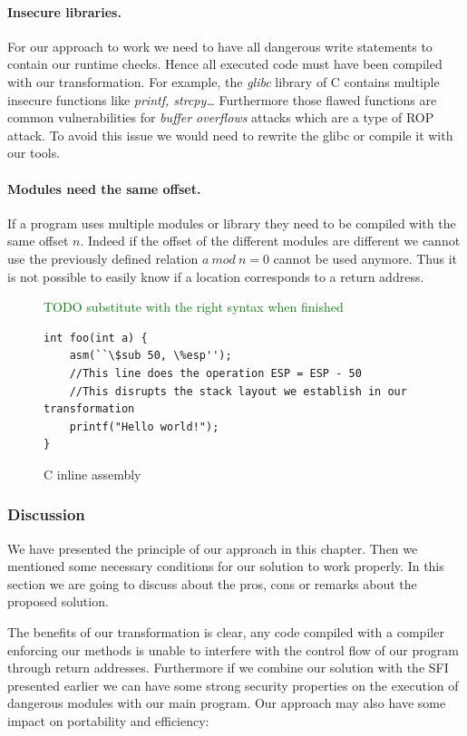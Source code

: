 \documentclass[11pt]{sdm}
\begin{document}
\paragraph{Insecure libraries.}
\label{par:Insecure libraries}

For our approach to work we need to have all dangerous write statements to contain our runtime checks. Hence all executed code must have been compiled with our transformation. For example, the \textit{glibc} library of C contains multiple insecure functions like \textit{printf, strcpy\dots} Furthermore those flawed functions are common vulnerabilities for \textit{buffer overflows} attacks which are a type of ROP attack. To avoid this issue we would need to rewrite the glibc or compile it with our tools.

\paragraph{Modules need the same offset.}
\label{par:Modules need the same offset}
If a program uses multiple modules or library they need to be compiled with the same offset $n$. Indeed if the offset of the different modules are different we cannot use the previously defined relation $a~mod~n=0$ cannot be used anymore. Thus it is not possible to easily know if a location corresponds to a return address.

\begin{figure}[!ht]
\textcolor{green}{TODO substitute with the right syntax when finished}
\begin{lstlisting}
int foo(int a) {
	asm(``\$sub 50, \%esp'');
	//This line does the operation ESP = ESP - 50
	//This disrupts the stack layout we establish in our transformation
	printf("Hello world!");
}
\end{lstlisting}
\centering
\caption{C inline assembly}
\label{inline_assembly}
\end{figure}

\subsubsection{Discussion}
\label{ssub:Discussion}
	We have presented the principle of our approach in this chapter. Then we mentioned some necessary conditions for our solution to work properly. In this section we are going to discuss about the pros, cons or remarks about the proposed solution.

	The benefits of our transformation is clear, any code compiled with a compiler enforcing our methods is unable to interfere with the control flow of our program through return addresses.
	Furthermore if we combine our solution with the SFI presented earlier we can have some strong security properties on the execution of dangerous modules with our main program.
Our approach may also have some impact on portability and efficiency:
\end{document}
